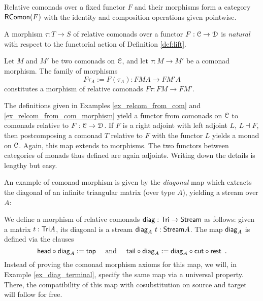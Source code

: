 \documentclass[a4paper,USenglish]{lipics}
\begin{document}
\noindent
Relative comonads over a fixed functor $F$ and their morphisms form a category $\mathsf{RComon}(F)$ with the identity and composition operations given pointwise.

\begin{rem}
A morphism $\tau : T\to S$ of relative comonads over a functor $F:{\mathcal{C}}\to\mathcal{D}$ is  \emph{natural}
with respect to the functorial action of Definition \ref{def:lift}.
\end{rem}


\begin{example}\label{ex_relcom_from_com_morphism}
 Let $M$ and $M'$ be two comonads on ${\mathcal{C}}$, and let $\tau : M \to M'$ be a comonad morphism. 
 The family of morphisms \[F\tau_A := F(\tau_A) : FMA \to FM'A\] constitutes a morphism of 
 relative comonads $F\tau : FM\to FM'$.
\end{example}


\begin{rem}
 The definitions given in Examples \ref{ex_relcom_from_com} and \ref{ex_relcom_from_com_morphism} yield a functor from 
 comonads on ${\mathcal{C}}$ to comonads relative to $F:{\mathcal{C}}\to\mathcal{D}$. 
 If $F$ is a right adjoint with left adjoint $L$, $L\dashv F$, then postcomposing a comonad $T$ relative to $F$ with the functor $L$
 yields a monad on ${\mathcal{C}}$. Again, this map extends to morphisms.
 The two functors between categories of monads thus defined are again adjoints.
 Writing down the details is lengthy but easy.
\end{rem}



An example of comonad morphism is given by the \emph{diagonal} map which extracts the diagonal of an infinite triangular matrix (over type $A$),
yielding a stream over $A$:

\begin{example}\label{ex_diag}
We define a morphism of relative comonads $\mathsf{diag} : \mathsf{Tri} \to \mathsf{Stream}$ as follows:
given a matrix $t : \mathsf{Tri} A$, its diagonal is a stream $\mathsf{diag}_A~t : \mathsf{Stream} A$.
The map $\mathsf{diag}_A$ is defined via the clauses
 \begin{equation*} \comp{\diagonal_A}{\shead} := \head \quad\text{ and } \quad %
                  \comp{\diagonal_A}{\stail} := \comp{\comp{\tail}{\cut}}{\diagonal_A} \enspace . %
 \end{equation*}
Instead of proving the comonad morphism axioms for this map, we will, in Example \ref{ex_diag_terminal}, specify the same map via a universal property. 
There, the compatibility of this map with 
cosubstitution on source and target will follow for free.



\end{example}
\end{document}
